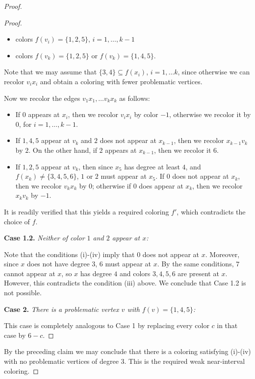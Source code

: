 \documentclass[12pt]{article}
\theoremstyle{plain}
\theoremstyle{definition}
\numberwithin{equation}{section}
\begin{document}
\begin{proof}
\begin{proof}
\begin{itemize}
	\item colors $f(v_i)=\{1,2,5\}$, $i=1,\dots, k-1$

	\item colors $f(v_k)=\{1,2,5\}$ or $f(v_k)=\{1,4,5\}$.

\end{itemize}	
	Note that we may assume that $\{3,4\} \subseteq f(x_i)$,  $i=1,\dots k$, 
	since otherwise we can recolor $v_i x_i$
	and obtain a coloring with fewer problematic vertices.

	Now we recolor the edges $v_1x_1, \dots v_k x_k$ as follows:

\begin{itemize}

	\item If $0$ appears at $x_i$, then we recolor $v_i x_i$ by color $-1$, otherwise 
	we recolor it by $0$, for $i=1,\dots, k-1$.
	
	\item If $1,4,5$ appear at $v_k$ and $2$ does not appear at $x_{k-1}$, then we recolor $x_{k-1}v_k$
 	by $2$. On the other
	hand, if $2$ appears at $x_{k-1}$, then we recolor it $6$.


	\item If $1,2,5$ appear at $v_k$, then since $x_5$ has degree at least $4$, and 
	$f(x_k) \neq \{3,4,5,6\}$, $1$ or $2$ must appear at $x_5$.
	If $0$ does not appear at $x_k$, then we recolor $v_kx_k$ by $0$;
	otherwise if $0$ does appear at $x_k$, then we recolor $x_k v_k$ by $-1$.
\end{itemize}

	It is readily verified that this yields a required coloring $f'$, which contradicts the choice of $f$.

	\bigskip

	{\bf Case 1.2.} {\em Neither of color $1$ and $2$ appear at $x$:}

	Note that the conditions (i)-(iv) imply that $0$ does not appear at $x$. 
	Moreover, since $x$ does not have degree $3$, $6$ must appear at $x$.
	By the same conditions, $7$ cannot appear at $x$, so
	$x$ has degree $4$ and colors $3,4,5,6$ are present at $x$.
	However, this contradicts the condition (iii) above.
	We conclude that Case 1.2 is not possible.


	\bigskip

	{\bf Case 2.}	 {\em There is a problematic vertex $v$ with $f(v) = \{1,4,5\}$:}

	This case is completely analogous to Case 1 by replacing every color $c$ in that case by $6-c$.
\end{proof}	
\bigskip

	By the preceding claim we may conclude that there is a coloring satisfying (i)-(iv) with no problematic
	vertices of degree $3$. This is the required weak near-interval coloring.
\end{proof}
\end{document}
